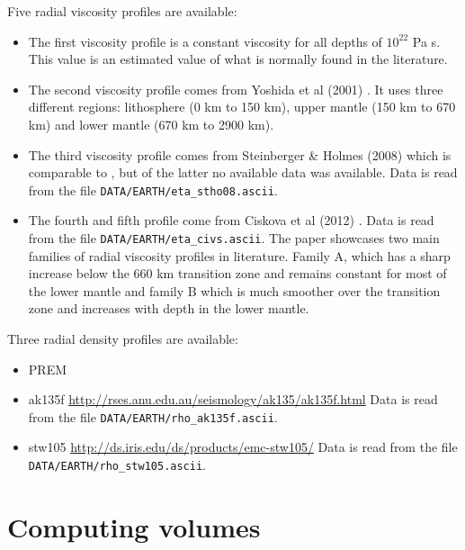 Five radial viscosity profiles are available:
\begin{itemize}
\item The first viscosity profile is a constant viscosity for all depths of $10^{22}$ Pa s.  
This value is an estimated value of what is normally found in the literature. 

\item The second viscosity profile comes from Yoshida et al (2001) \cite{yohk01}. It uses three different regions: lithosphere (0 km to 150 km), upper mantle (150 km to 670 km) and lower mantle (670 km to 2900 km). 

\item The third viscosity profile comes from Steinberger \& Holmes (2008) \cite{stho08} 
which is comparable to \cite{stca06}, but of the latter no available data was available. 
Data is read from the file \texttt{DATA/EARTH/eta\_stho08.ascii}. 

\item The fourth and fifth profile come from Ciskova et al (2012) \cite{civs12}. 
Data is read from the file \texttt{DATA/EARTH/eta\_civs.ascii}. 
The paper showcases two main families of radial viscosity profiles in literature. Family A, which has a sharp 
increase below the 660 km transition zone and remains constant for most of the lower mantle 
and family B which is much smoother over the transition zone and increases with depth in the lower mantle. 

\end{itemize}

Three radial density profiles are available:

\begin{itemize}
\item PREM \cite{dzan81}
\item ak135f \cite{keeb95} \url{http://rses.anu.edu.au/seismology/ak135/ak135f.html} 
Data is read from the file \texttt{DATA/EARTH/rho\_ak135f.ascii}. 
\item stw105 \cite{kued08} \url{http://ds.iris.edu/ds/products/emc-stw105/}
Data is read from the file \texttt{DATA/EARTH/rho\_stw105.ascii}. 
\end{itemize}



\newpage
\section*{Computing volumes}

